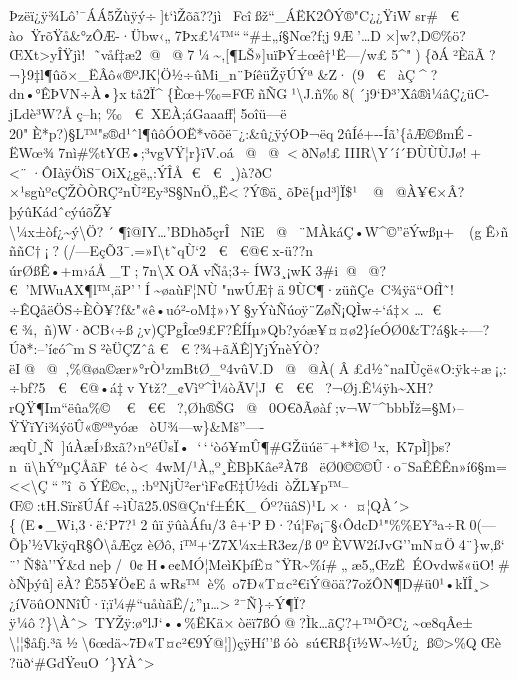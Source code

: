 Þzë­ï¿ÿ¾Lô'¯ÁÁ5Žù\textbar ÿý÷{]}t`ìŽõã??jìFcîßž``\_\textbar ÁËK2ÔÝ®"C¿¿ŸiWsr\#
€ 
àoŸrõŸ\textbar å\&°zÔÆ-·Übw‹„7Þx£¼™``\,``\#±„í§\textquotesingle Nœ?ƒ;j9Æ'\ldots D×{]}w?,D©\%ö?ŒXt\textgreater yÎŸjì!
˜våf‡æ2@ @ 7¼\textasciitilde,{[}¶LŠ\textquotesingle»{]}uïÞÝ±œê†¹Ë---/w£5\^{}")\{\textbar ðÁ²ÈäÃ?¬\}9‡l¶ûõ×\_ËÂô«®ºJK¦Ö½÷ûMi\_n¨ÞíêüŽÿÚÝª\&Z·(9
€ 
àÇ\^{}?dn•°ÊÞVN÷À•\}xtå2Ï\^{}\{Èœ+‰=FŒñÑG¹\textbackslash J.ñ‰8(´j9`Ð³'Xâ®ì¼âÇ¿üC-jLdè³W?Åç--h;
‰  € XEÀ;áGaaaff¦5oîü---ë
20"È*p?)§L™"s®d¹ˆl¶ûôÓOË*võõë¯¿:\&û¿ÿýOÞ¬ëq2ûÍé+-\/-Íã'\{åÆ©ßmÉ-ËWœ¾7nì\#\%tYŒ•;³vgVŸ¦r\}ïV.oá@ @ \textlessðNø!£IIIR\textbackslash Y´í´ÐÙÙÙJø!+\textless¨·ÔIàÿÖìS¯OiX¿gë„:ÝÎÅ
€  € ¸)à?ðC
×¹sgùºcÇŽÒÒRÇ²nÙ²Ey³S§NnÖ„Ë\textless?Ý®ä¸õÞë\{µd³{]}Ï\$¹@ @À¥€×Â?þýûKádˆcýúõŽ¥\textbackslash¼x±òf¿\textasciitilde ý\textbackslash Ö?´\textbar¶î@IY\ldots'BDhð5çrÎ~NîE @ ¨MÀkáÇ•W\^{}©''ëÝwßµ+~(gÊ›ñññC†¡?(/---EçÕ3¯.=»I\textbackslash t˜qÙ`2
€  €@€x-ü??n
úrØßÊ•+m›áÅ\_T;7n\textbackslash XOÃvÑå;3÷ÍW3¸¡wK3\#i@ @ ?€'MWuAX¶l™,äP'\,'Í\textasciitilde øaùF¦NÙ"nwÚÆ†ä9ÙC¶·züñÇe~C¾ÿä``OfÌ˜!÷ÊQåëÖ­S÷ÈÒ¥?f\&"«ê•uó²-oM‡»›Y§yÝùÑúoÿ¨ZøÑ¡QÌw÷`á‡×\ldots
€ 
€ ¾,~ñ)W·ðCB‹÷ß¿v)ÇPgÎœ9£F?ÊÍÍµ»Qb?yóæ¥¤¤ø2\}íeÓØ0\&T?á§k÷---?Úð*:--'í¢ó\^{}mS²èÜÇZˆâ
€ 
€ ?¾+ãÄÊ{]}YjÝnèÝÒ?ëI­@ @ ,\%@øa©ær»°rÒ¹zmBtØ\_º4vûV.D @ @À(Â£d½˜naIÙçë«O:ÿk÷æ¡,:÷bƒ?5
€  €@• á‡vYtž?\_¢Vìº\^{}Ì¼òÃV¦J € 
€€?¬Øj.Ê¼ÿh\textasciitilde XH?rQŸ¶Im``ëûa\%© € 
€€?,Øh®ŠG @ 0O€ðÃøàƒ;v¬W¯\^{}bbbÏž=§M›--ŸŸïYi¾ýöÛ«®ºªyóæòU¾---w\}\&Mš''----æqÙ¸Ñ{]}úÀæÍ›ßxã?›nºéÜsÏ•`\,`\,`òó¥mÛ¶\#GŽüúë¯+**Ì©¹x,~K7pÌ{]}þs?n~ü\textbackslash hÝºµÇÅãFtéò\textless~4wM/¹À„º¸ÈBþKâe²À7ß\textbarëØ0©©©Û·o¯SaÊÊÊn»í6§m=\textless\textless\textbackslash Ç``\,''îõÝË©c‚„:bºNjÙ²er`ìF¢Œ‡Ú½di~òŽL¥p™--Œ©:tH.SïršÚÁƒ÷ìÙã25.0S@Çn`f±ÉK\_Óº?üâS)¹L×·
¤¦QÀ´\textgreater{} \{(E•\_Wi,3·ë.`P7?¹2ûïÿûàÁƒu/3
ê+`PÐ·?ú¦Fø¡¯§‹ÔdcD¹"\%\%EY³a÷R0(---Õþ'½VkÿqR§Ô\textbackslash åÆçz
èØô,i™+`Z7X¼x±R3ez\textquotesingle/ß0ºÈVW2íJvG''mN¤Ö4¨\}w,ß`
¨'Ñ\$à''Ý\&dneþ/0¢H•e¢MÓ¦MeìKþíË¤˜\textquotesingle Ÿ\textbar R\textasciitilde\%í\#„æ5„ŒzËÉOvdwš«üO!\#òÑþýû{]}ëÀ?Ê55¥Ö¢EåwRs™è\%~o7Ð«T¤c²€iÝ@öä?7ožÔN¶D\#ü0¹•kÏÎ¸\textgreater{}
¿íVöûONNîÛ·ï;ï¼\#``uåùãË/¿''µ\ldots\textgreater{}²¯Ñ\}÷Ý\textquotesingle¶Ï?ÿ¼ô?\}\textbackslash Àˆ\textgreater~TYŽÿ:\textbar ø°lJ`••\%ËKä×òëï7ß\textbar Ó@?Ìk\ldots ãÇ?+™Õ²C¿\textasciitilde œ8qÂe±\textbackslash¦¦\$åfj.³ã½\textbackslash6œdä\textasciitilde7Ð«T¤c²€9Ý@¦{]})çÿHí''ßóòsú€Rß\{ï½W\textasciitilde½Ú¿ß©\textgreater\%QŒè?üð`\#GdŸeuO´\}YÀˆ\textgreater{}

